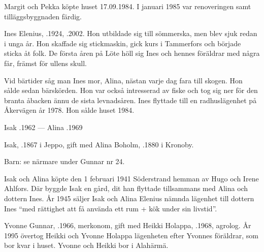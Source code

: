 Margit och Pekka köpte huset 17.09.1984. I januari 1985 var renoveringen samt tilläggsbyggnaden färdig.


Ines Elenius, .1924, .2002. Hon utbildade sig till sömmerska, men blev sjuk redan i unga år. Hon skaffade sig stickmaskin, gick kurs i Tammerfors och började sticka åt folk. De första åren på Löte höll sig Ines och hennes föräldrar med några får, främst för ullens skull.

Vid bärtider såg man Ines mor, Alina, nästan varje dag fara till skogen. Hon sålde sedan bärskörden. Hon var också intresserad av fiske och tog sig ner för den branta åbacken ännu de sista levnadsåren. Ines flyttade till en radhuslägenhet på Åkervägen år 1978. Hon sålde huset 1984.

Isak .1962  ---  Alina .1969


Isak, .1867 i Jeppo, gift med Alina Boholm, .1880 i Kronoby.

Barn: se närmare under Gunnar nr 24.

Isak och Alina köpte den 1 februari 1941 Söderstrand hemman av Hugo och Irene Ahlfors. Där byggde Isak en gård, dit han flyttade tillsammans med Alina och dottern Ines. År 1945 säljer Isak och Alina Elenius nämnda lägenhet till dottern Ines 	``med rättighet att få använda ett rum + kök under sin livstid''.






Yvonne Gunnar, .1966, merkonom, gift med Heikki Holappa, .1968, agrolog. År 1995 övertog Heikki och Yvonne Holappa lägenheten efter Yvonnes föräldrar, som bor kvar i huset. Yvonne och Heikki bor i Alahärmä.
\begin{jhchildren}
  \item {}
  \item {}
  \item {}
  \item {}
  \item {}
\end{jhchildren}

